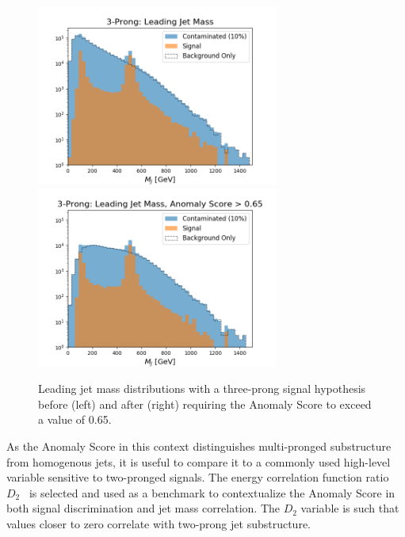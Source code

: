 \documentclass[12pt, a4paper]{article}
\begin{document}
\begin{figure}[H]
	\begin{center}
		\includegraphics[width=225pt]{imgs/bugfix/3Prong_Contaminated_10p0_J_Mass_Multi_Lead_SaveForPaper.png}
		\includegraphics[width=225pt]{imgs/bugfix/3Prong_Contaminated_10p0_J_Mass_AnomScore0p65_Multi_Lead_SaveForPaper.png}
	\end{center}
	\caption{Leading jet mass distributions with a three-prong signal hypothesis before (left) and after (right) requiring the Anomaly Score to exceed a value of 0.65.}
	\label{fig:3P_lj_mass}
\end{figure}




As the Anomaly Score in this context distinguishes multi-pronged substructure from homogenous jets, it is useful to compare it to a commonly used high-level variable sensitive to two-pronged signals. The energy correlation function ratio $D_2$~\cite{d2} is selected and used as a benchmark to contextualize the Anomaly Score in both signal discrimination and jet mass correlation. The $D_2$ variable is such that values closer to zero correlate with two-prong jet substructure. 
\end{document}

